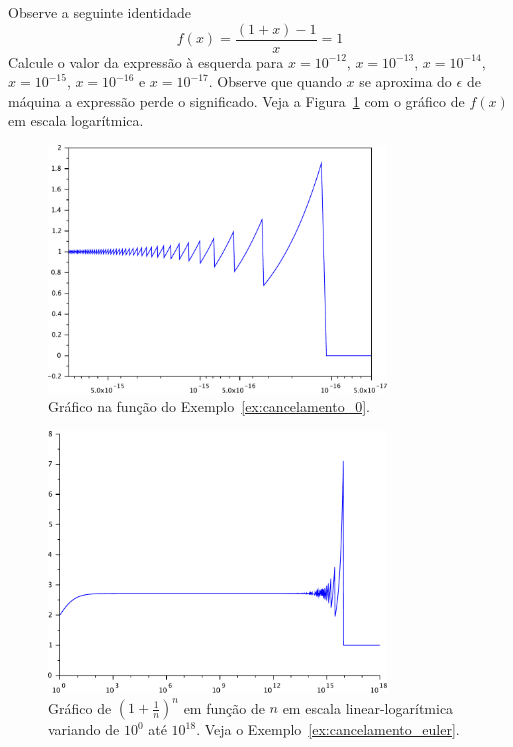\begin{ex}\label{ex:cancelamento_0}Observe a seguinte identidade
$$
f(x)=\frac{(1+x)-1}{x}=1
$$
Calcule o valor da expressão à esquerda para $x=10^{-12}$, $x=10^{-13}$, $x=10^{-14}$, $x=10^{-15}$, $x=10^{-16}$ e $x=10^{-17}$. Observe que quando $x$ se aproxima do $\epsilon$ de máquina a expressão perde o significado. Veja a Figura~\ref{fig:cancelamento_0} com o gráfico de $f(x)$ em escala logarítmica.
\end{ex}

\begin{figure}
  \centering
  \includegraphics[width=0.8\textwidth]{./cap_aritmetica/pics/cancelamento_0}  
  \caption{Gráfico na função do Exemplo~\ref{ex:cancelamento_0}.}
  \label{fig:cancelamento_0}
\end{figure}


\begin{figure}
  \includegraphics[width=0.8\textwidth]{./cap_aritmetica/pics/cancelamento_euler}
  \caption{Gráfico de $\left(1+\frac{1}{n}\right)^n$ em função de $n$ em escala linear-logarítmica variando de $10^0$ até $10^{18}$. Veja o Exemplo~\ref{ex:cancelamento_euler}.}
  \label{fig:cancelamento_euler}
\end{figure}

